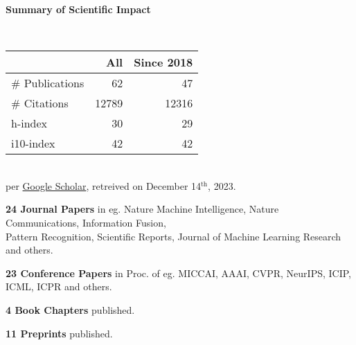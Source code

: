 \headedsection %
{\bf Summary of Scientific Impact}{}{}
{
    \qquad~~~~
    \begin{minipage}[t]{0.6\textwidth}
        \begin{tabular}{lrr}
        \hline
         & All & Since 2018\\
        \hline
        \# Publications & 62     & 47    \\
        \# Citations    & 12789  & 12316 \\
        h-index         & 30     & 29    \\
        i10-index       & 42     & 42    \\
        \hline
    \end{tabular}
    \\
    {\footnotesize{
        per \href{https://scholar.google.com/citations?user=wpLQuroAAAAJ}{Google Scholar},
        retreived on December 14$^\text{th}$, 2023.
        }
    }
    \end{minipage}

    \ifdefined\shortcv
        \vstep
        {\bf 24 Journal Papers} in eg. Nature Machine Intelligence, Nature Communications, Information Fusion,\\
        \hspace*{\fill} Pattern Recognition, Scientific Reports, Journal of Machine Learning Research and others.

        {\bf 23 Conference Papers} in Proc. of eg. MICCAI, AAAI, CVPR, NeurIPS, ICIP, ICML, ICPR and others.

        {\bf 4 Book Chapters} published.

        {\bf 11 Preprints} published.
        
    \else
        {}
    \fi

}
